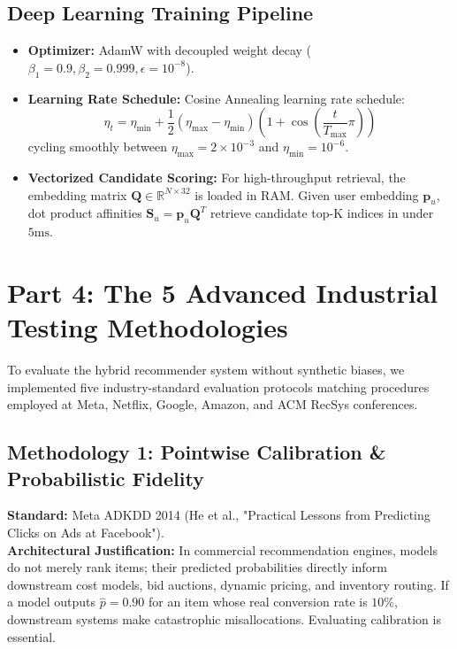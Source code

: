 \documentclass[11pt,a4paper]{article}
\begin{document}
\subsection{Deep Learning Training Pipeline}
\begin{itemize}[leftmargin=*]
    \item \textbf{Optimizer:} AdamW with decoupled weight decay ($\beta_1 = 0.9, \beta_2 = 0.999, \epsilon = 10^{-8}$).
    \item \textbf{Learning Rate Schedule:} Cosine Annealing learning rate schedule:
    \begin{equation}
        \eta_t = \eta_{\min} + \frac{1}{2}\left(\eta_{\max} - \eta_{\min}\right)\left(1 + \cos\left(\frac{t}{T_{\max}} \pi\right)\right)
    \end{equation}
    cycling smoothly between $\eta_{\max} = 2 \times 10^{-3}$ and $\eta_{\min} = 10^{-6}$.
    \item \textbf{Vectorized Candidate Scoring:} For high-throughput retrieval, the embedding matrix $\mathbf{Q} \in \mathbb{R}^{N \times 32}$ is loaded in RAM. Given user embedding $\mathbf{p}_u$, dot product affinities $\mathbf{S}_u = \mathbf{p}_u \mathbf{Q}^T$ retrieve candidate top-K indices in under $5\text{ms}$.
\end{itemize}

\newpage
\section{Part 4: The 5 Advanced Industrial Testing Methodologies}

To evaluate the hybrid recommender system without synthetic biases, we implemented five industry-standard evaluation protocols matching procedures employed at Meta, Netflix, Google, Amazon, and ACM RecSys conferences.

\subsection{Methodology 1: Pointwise Calibration \& Probabilistic Fidelity}
\textbf{Standard:} Meta ADKDD 2014 (He et al., "Practical Lessons from Predicting Clicks on Ads at Facebook").\\
\textbf{Architectural Justification:} In commercial recommendation engines, models do not merely rank items; their predicted probabilities directly inform downstream cost models, bid auctions, dynamic pricing, and inventory routing. If a model outputs $\hat{p} = 0.90$ for an item whose real conversion rate is $10\%$, downstream systems make catastrophic misallocations. Evaluating calibration is essential.
\end{document}

